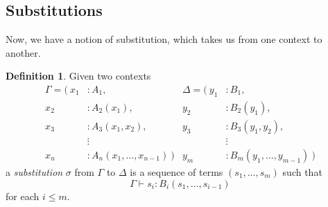 \documentclass{article}
\theoremstyle{definition}
\newtheorem{definition}{Definition}[section]
\newcommand{\proves}{\vdash}
\begin{document}
\subsection{Substitutions}

Now, we have a notion of substitution, which takes us from one context to another.


\begin{definition}
    Given two contexts
    \begin{align*}
    \Gamma = \big(\ x_1 &: A_1,                             &\Delta = \big(\ y_1 &: B_1,\\
                    x_2 &: A_2(x_1),                        &                y_2 &: B_2(y_1),\\
                    x_3 &: A_3(x_1,x_2),                    &                y_3 &: B_3(y_1,y_2),\\
                    &\mathrel{\vdots}                       &                &\mathrel{\vdots}\\
                    x_n &: A_n(x_1,\ldots,x_{n-1})\ \big)   &                y_m &: B_m(y_1,\ldots,y_{m-1})\ \big)
    \end{align*}
    a \textit{substitution} $\sigma$ from $\Gamma$ to $\Delta$ is a sequence of terms $(s_1, \ldots, s_m)$ such that $$\Gamma \proves s_i : B_i(s_1,\ldots,s_{i-1})$$ for each $i \leq m$.
    
\end{definition}
\end{document}
